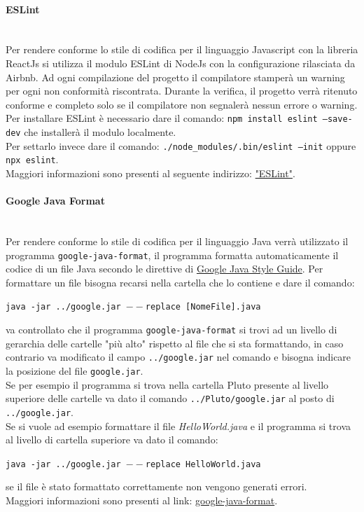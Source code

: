 \paragraph{ESLint}\mbox{}\\
Per rendere conforme lo stile di codifica per il linguaggio Javascript con la libreria ReactJs si utilizza il modulo ESLint di NodeJs con la configurazione rilasciata da Airbnb. Ad ogni compilazione del progetto il compilatore stamperà un warning per ogni non conformità riscontrata. Durante la verifica, il progetto verrà ritenuto conforme e completo solo se il compilatore non segnalerà nessun errore o warning.\\
Per installare ESLint è necessario dare il comando: \texttt{npm install eslint --save-dev} che installerà il modulo localmente.\\
Per settarlo invece dare il comando: \texttt{./node\_modules/.bin/eslint --init} oppure \texttt{npx eslint}.\\
Maggiori informazioni sono presenti al seguente indirizzo: \href{https://eslint.org/}{"ESLint"}.

\paragraph{Google Java Format}\mbox{}\\
Per rendere conforme lo stile di codifica per il linguaggio Java verrà utilizzato il programma \texttt{google-java-format}, il programma formatta automaticamente il codice di un file Java secondo le direttive di \href{https://google.github.io/styleguide/javaguide.html}{Google Java Style Guide}.
Per formattare un file bisogna recarsi nella cartella che lo contiene e  dare il comando: 
\begin{center}
	 \texttt{java -jar ../google.jar $--$replace [NomeFile].java}
\end{center}
va controllato che il programma \texttt{google-java-format} si trovi ad un livello di gerarchia delle cartelle "più alto" rispetto al file che si sta formattando, in caso contrario va modificato il campo \texttt{../google.jar} nel comando e bisogna indicare la posizione del file \texttt{google.jar}. \\
Se per esempio il programma si trova nella cartella Pluto presente al livello superiore delle cartelle va dato il comando \texttt{../Pluto/google.jar} al posto di \texttt{../google.jar}.\\
Se si vuole ad esempio formattare il file \textit{HelloWorld.java} e il programma si trova al livello di cartella superiore va dato il comando: 
\begin{center}
\texttt{java -jar ../google.jar $--$replace HelloWorld.java}
\end{center}
se il file è stato formattato correttamente non vengono generati errori.\\
Maggiori informazioni sono presenti al link: \href{https://github.com/google/google-java-format}{google-java-format}.

